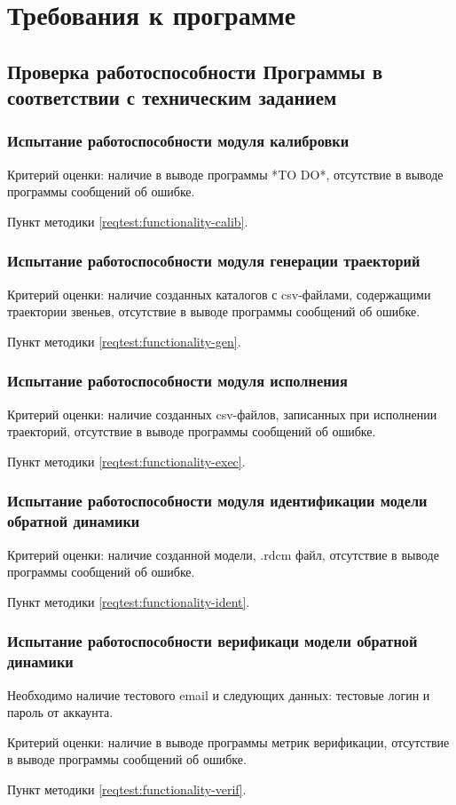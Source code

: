 \newpage
\section{Требования к программе}

\subsection{Проверка работоспособности Программы \productname в соответствии с техническим заданием} \label{req:check-prog}

\subsubsection{Испытание работоспособности модуля калибровки} \label{req:functionality-calib}
Критерий оценки: наличие в выводе программы *TO DO*, отсутствие в выводе программы сообщений об ошибке.

Пункт методики \ref{reqtest:functionality-calib}.

\subsubsection{Испытание работоспособности модуля генерации траекторий} \label{req:functionality-gen}
Критерий оценки: наличие созданных каталогов с csv-файлами, содержащими траектории звеньев, отсутствие в выводе программы сообщений об ошибке.

Пункт методики \ref{reqtest:functionality-gen}.

\subsubsection{Испытание работоспособности модуля исполнения} \label{req:functionality-exec}
Критерий оценки: наличие созданных csv-файлов, записанных при исполнении траекторий, отсутствие в выводе программы сообщений об ошибке.

Пункт методики \ref{reqtest:functionality-exec}.

\subsubsection{Испытание работоспособности модуля идентификации модели обратной динамики} \label{req:functionality-ident}
Критерий оценки: наличие созданной модели, .rdcm файл, отсутствие в выводе программы сообщений об ошибке.

Пункт методики \ref{reqtest:functionality-ident}.

\subsubsection{Испытание работоспособности верификаци модели обратной динамики} \label{req:functionality-verif}
Необходимо наличие тестового email и следующих данных: тестовые логин и пароль от аккаунта.

Критерий оценки: наличие в выводе программы метрик верификации, отсутствие в выводе программы сообщений об ошибке.

Пункт методики \ref{reqtest:functionality-verif}.
